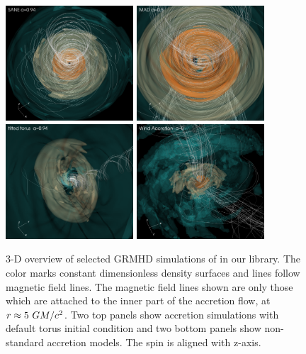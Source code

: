\begin{figure}
  \centering
  \includegraphics[width=0.425\textwidth]{figures/sane_3D_corrected.png}\hspace{1.5pt}%
  \includegraphics[width=0.425\textwidth]{figures/mad_3D_corrected.png}\\
  \includegraphics[width=0.425\textwidth]{figures/tilted_3D_corrected.png}\hspace{1.5pt}%
  \includegraphics[width=0.425\textwidth]{figures/ressler_3D_corrected.png}
  \caption{3-D overview of selected GRMHD simulations of \sgra in our library.
    The color marks constant dimensionless density surfaces and lines follow magnetic field lines.  The magnetic field lines shown are only those which are attached to the inner part of the accretion flow, at $r\approx 5~GM/c^2$.
    Two top panels show accretion simulations with default torus initial condition and
    two bottom panels show non-standard accretion models.
    The spin is aligned with z-axis.}
  \label{fig:GRMHD}
\end{figure}


